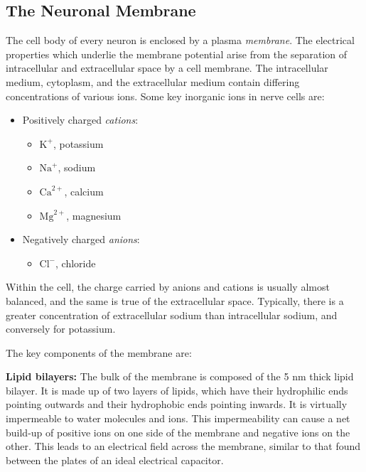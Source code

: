 \subsection{The Neuronal Membrane}

The cell body of every neuron is enclosed by a plasma \textit{membrane}. The electrical properties which underlie the membrane potential arise from the separation of intracellular and extracellular space by a cell membrane. The intracellular medium, cytoplasm, and the extracellular medium contain differing concentrations of various ions. Some key inorganic ions in nerve cells are: 

\begin{itemize}
    \item Positively charged \textit{cations}:
    \begin{itemize}
        \item $\mathrm{K}^+$, potassium
        \item $\mathrm{Na}^+$, sodium 
        \item $\mathrm{Ca}^{2+}$, calcium
        \item $\mathrm{Mg}^{2+}$, magnesium
    \end{itemize}
    \item Negatively charged \textit{anions}:
    \begin{itemize}
        \item $\mathrm{Cl}^-$, chloride
    \end{itemize}
\end{itemize}


Within the cell, the charge carried by anions and cations is usually almost balanced, and the same is true of the extracellular space. Typically, there is a greater concentration of extracellular sodium than intracellular sodium, and conversely for potassium. 

The key components of the membrane are: 

\textbf{Lipid bilayers:} The bulk of the membrane is composed of the 5 nm thick lipid bilayer. It is made up of two layers of lipids, which have their hydrophilic ends pointing outwards and their hydrophobic ends pointing inwards. It is virtually impermeable to water molecules and ions. This impermeability can cause a net build-up of positive ions on one side of the membrane and negative ions on the other. This leads to an electrical field across the membrane, similar to that found between the plates of an ideal electrical capacitor. 

